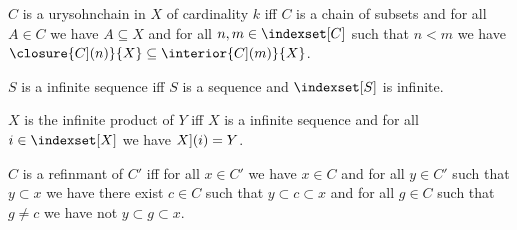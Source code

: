 \begin{definition}\label{urysohnchain}
    $C$ is a urysohnchain in $X$ of cardinality $k$ iff %
    $C$ is a chain of subsets and
    for all $A \in C$ we have $A \subseteq X$ and
    for all $n,m \in \indexset[C]$ such that $n < m$ we have $\closure{\index[C](n)}{X} \subseteq \interior{\index[C](m)}{X}$.
\end{definition}

\begin{abbreviation}\label{infinte_sequence}
    $S$ is a infinite sequence iff $S$ is a sequence and $\indexset[S]$ is infinite.
\end{abbreviation}

\begin{definition}\label{infinite_product}
    $X$ is the infinite product of $Y$ iff
    $X$ is a infinite sequence and for all $i \in \indexset[X]$ we have $\index[X](i) = Y$.
\end{definition}

\begin{definition}\label{refinmant}
    $C$ is a refinmant of $C'$ iff for all $x \in C'$ we have $x \in C$ and 
    for all $y \in C'$ such that $y \subset x$ we have there exist $c \in C$ such that $y \subset c \subset x$
    and for all $g \in C$ such that $g \neq c$ we have not $y \subset g \subset x$.
\end{definition}



%                     


